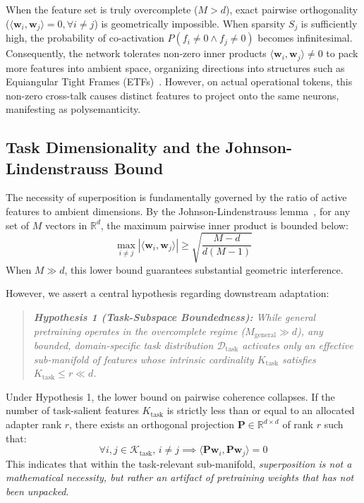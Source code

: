 \documentclass[10pt,twocolumn,letterpaper]{article}
\begin{document}
When the feature set is truly overcomplete ($M > d$), exact pairwise orthogonality ($\langle \bm{w}_i, \bm{w}_j \rangle = 0, \forall i \neq j$) is geometrically impossible. When sparsity $S_j$ is sufficiently high, the probability of co-activation $P(f_i \neq 0 \land f_j \neq 0)$ becomes infinitesimal. Consequently, the network tolerates non-zero inner products $\langle \bm{w}_i, \bm{w}_j \rangle \neq 0$ to pack more features into ambient space, organizing directions into structures such as Equiangular Tight Frames (ETFs)~\cite{tropp2005condition}. However, on actual operational tokens, this non-zero cross-talk causes distinct features to project onto the same neurons, manifesting as polysemanticity.

\subsection{Task Dimensionality and the Johnson-Lindenstrauss Bound}
\label{subsec:jl_bound}

The necessity of superposition is fundamentally governed by the ratio of active features to ambient dimensions. By the Johnson-Lindenstrauss lemma~\cite{johnson1984extensions}, for any set of $M$ vectors in $\mathbb{R}^d$, the maximum pairwise inner product is bounded below:
\begin{equation}
    \max_{i \neq j} |\langle \bm{w}_i, \bm{w}_j \rangle| \ge \sqrt{\frac{M - d}{d(M - 1)}}
\end{equation}
When $M \gg d$, this lower bound guarantees substantial geometric interference. 

However, we assert a central hypothesis regarding downstream adaptation:
\begin{quote}
\textit{\textbf{Hypothesis 1 (Task-Subspace Boundedness):} While general pretraining operates in the overcomplete regime ($M_{\text{general}} \gg d$), any bounded, domain-specific task distribution $\mathcal{D}_{\text{task}}$ activates only an effective sub-manifold of features whose intrinsic cardinality $K_{\text{task}}$ satisfies $K_{\text{task}} \le r \ll d$.}
\end{quote}

Under Hypothesis 1, the lower bound on pairwise coherence collapses. If the number of task-salient features $K_{\text{task}}$ is strictly less than or equal to an allocated adapter rank $r$, there exists an orthogonal projection $\bm{P} \in \mathbb{R}^{d \times d}$ of rank $r$ such that:
\begin{equation}
    \forall i, j \in \mathcal{K}_{\text{task}}, \, i \neq j \implies \langle \bm{P}\bm{w}_i, \bm{P}\bm{w}_j \rangle = 0
\end{equation}
This indicates that within the task-relevant sub-manifold, \textit{superposition is not a mathematical necessity, but rather an artifact of pretraining weights that has not been unpacked}. 
\end{document}
